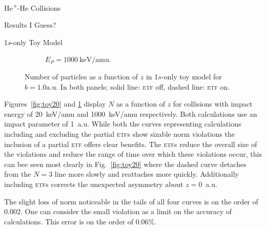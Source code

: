 \documentclass[letterpaper, 11 pt]{report}
\begin{document}
\begin{chapter}{\texorpdfstring{He\textsuperscript{+}}{He+}-He Collisions \label{chap:hephe}}
\begin{section}{Results I Guess? \label{sec:hephe-disc}}
\begin{subsection}{1\textit{s}-only Toy Model \label{sec:toy}}
\begin{figure}[t]
\begin{subfigure}{.5\textwidth}
               \caption{$E_P = 1000~\mathrm{keV}/\mathrm{amu}$. \label{fig:toy1000}}
            \end{subfigure}
            \caption[Number of particles as a function of \textit{z} in 1\textit{s}-only toy model]
                    {Number of particles as a function of $z$ in 1$s$-only toy model for $b = 1.0
                    \mathrm{a.u}$. In both panels; solid line: \textsc{etf} off, dashed line:
                    \textsc{etf} on. \label{fig:toy}}
         \end{figure}

         Figures~\ref{fig:toy20} and \ref{fig:toy1000} display $N$ as a function of $z$ for collisions
         with impact energy of 20~keV/amu and 1000~keV/amu respectively. Both calculations use an impact
         parameter of 1~a.u. While both the curves representing calculations including and excluding the
         partial \textsc{etf}s show sizable norm violations the inclusion of a partial \textsc{etf}
         offers clear benefits. The \textsc{etf}s reduce the overall size of the violations and reduce
         the range of time over which these violations occur, this can bee seen most clearly in
         Fig.~\ref{fig:toy20} where the dashed curve detaches from the $N = 3$ line more slowly and
         reattaches more quickly. Additionally including \textsc{etf}s corrects the unexpected asymmetry
         about $z = 0$~a.u.

         The slight loss of norm noticeable in the tails of all four curves is on the order of $0.002$.
         One can consider the small violation as a limit on the accuracy of calculations. This error is
         on the order of $0.06 \%$.


\end{subsection}
\end{section}
\end{chapter}
\end{document}
